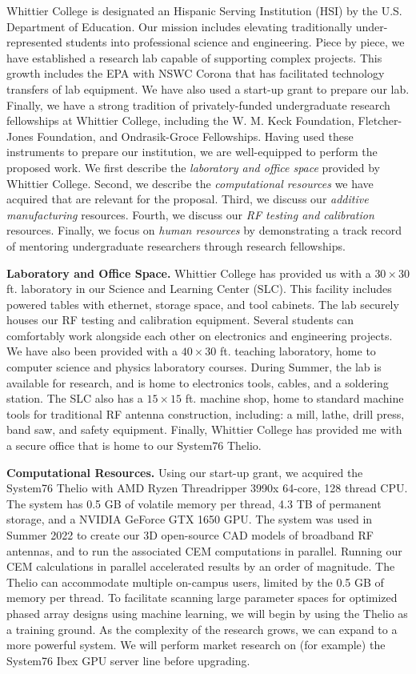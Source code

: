 \documentclass[11pt]{amsart}
\begin{document}
Whittier College is designated an Hispanic Serving Institution (HSI) by the U.S. Department of Education.  Our mission includes elevating traditionally under-represented students into professional science and engineering.  Piece by piece, we have established a research lab capable of supporting complex projects.  This growth includes the EPA with NSWC Corona that has facilitated technology transfers of lab equipment.  We have also used a start-up grant to prepare our lab.  Finally, we have a strong tradition of privately-funded undergraduate research fellowships at Whittier College, including the W. M. Keck Foundation, Fletcher-Jones Foundation, and Ondrasik-Groce Fellowships.  Having used these instruments to prepare our institution, we are well-equipped to perform the proposed work.  We first describe the \textit{laboratory and office space} provided by Whittier College.  Second, we describe the \textit{computational resources} we have acquired that are relevant for the proposal.  Third, we discuss our \textit{additive manufacturing} resources.  Fourth, we discuss our \textit{RF testing and calibration} resources.  Finally, we focus on \textit{human resources} by demonstrating a track record of mentoring undergraduate researchers through research fellowships. 

\textbf{Laboratory and Office Space.} Whittier College has provided us with a $30 \times 30$ ft. laboratory in our Science and Learning Center (SLC).  This facility includes powered tables with ethernet, storage space, and tool cabinets.  The lab securely houses our RF testing and calibration equipment.  Several students can comfortably work alongside each other on electronics and engineering projects.  We have also been provided with a $40 \times 30$ ft. teaching laboratory, home to computer science and physics laboratory courses.  During Summer, the lab is available for research, and is home to electronics tools, cables, and a soldering station.  The SLC also has a $15 \times 15$ ft. machine shop, home to standard machine tools for traditional RF antenna construction, including: a mill, lathe, drill press, band saw, and safety equipment.  Finally, Whittier College has provided me with a secure office that is home to our System76 Thelio. 

\textbf{Computational Resources.} Using our start-up grant, we acquired the System76 Thelio with AMD Ryzen Threadripper 3990x 64-core, 128 thread CPU.  The system has 0.5 GB of volatile memory per thread, 4.3 TB of permanent storage, and a NVIDIA GeForce GTX 1650 GPU.  The system was used in Summer 2022 to create our 3D open-source CAD models of broadband RF antennas, and to run the associated CEM computations in parallel.  Running our CEM calculations in parallel accelerated results by an order of magnitude.  The Thelio can accommodate multiple on-campus users, limited by the 0.5 GB of memory per thread.  To facilitate scanning large parameter spaces for optimized phased array designs using machine learning, we will begin by using the Thelio as a training ground.  As the complexity of the research grows, we can expand to a more powerful system.  We will perform market research on (for example) the System76 Ibex GPU server line before upgrading.  
\end{document}
